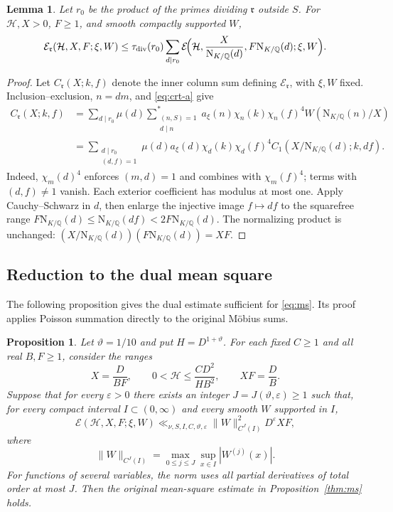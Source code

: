 \documentclass[11pt,a4paper]{article}
\numberwithin{equation}{section}
\numberwithin{figure}{section}
\newtheorem{proposition}[theorem]{Proposition}
\newtheorem{lemma}[theorem]{Lemma}
\theoremstyle{definition}
\theoremstyle{remark}
\newcommand{\Q}{\mathbb Q}
\newcommand{\NK}{\mathrm N_{K/\Q}}
\newcommand{\E}{\mathcal E}
\begin{document}
\begin{lemma}\label{lem:remove-exclusions}
Let $r_0$ be the product of the primes dividing $\mathfrak r$ outside
$S$. For $\mathcal H,X>0$, $F\ge1$, and smooth compactly supported $W$,
\begin{equation}\label{eq:remove-exclusions}
 \E_{\mathfrak r}(\mathcal H,X,F;\xi,W)
 \le\tau_{\mathrm{div}}(r_0)
 \sum_{d\mid r_0}\E\!\Bigl(\mathcal H,\frac X{\NK(d)},F\NK(d);\xi,W\Bigr).
\end{equation}
\end{lemma}
\begin{proof}
Let $C_{\mathfrak r}(X;k,f)$ denote the inner column sum defining
$\E_{\mathfrak r}$, with $\xi,W$ fixed. Inclusion--exclusion,
$n=dm$, and \eqref{eq:crt-a} give
\[
 \begin{aligned}
 C_{\mathfrak r}(X;k,f)
 &=\sum_{d\mid r_0}\mu(d)
   \sum_{\substack{(n,S)=1\\d\mid n}}^*
   a_\xi(n)\chi_n(k)\chi_n(f)^4W(\NK(n)/X)\\
 &=\sum_{\substack{d\mid r_0\\(d,f)=1}}
   \mu(d)a_\xi(d)\chi_d(k)\chi_d(f)^4
   C_1(X/\NK(d);k,df).
 \end{aligned}
\]
Indeed, $\chi_m(d)^4$ enforces $(m,d)=1$ and combines with
$\chi_m(f)^4$; terms with $(d,f)\ne1$ vanish. Each exterior
coefficient has modulus at most one. Apply Cauchy--Schwarz in $d$,
then enlarge the injective image $f\mapsto df$ to the squarefree
range $F\NK(d)\le\NK(df)<2F\NK(d)$. The normalizing product is
unchanged: $(X/\NK(d))(F\NK(d))=XF$.
\end{proof}


\subsection{Reduction to the dual mean square}
The following proposition gives the dual estimate sufficient for
\eqref{eq:ms}. Its proof applies Poisson summation directly to the
original M\"obius sums.

\begin{proposition}\label{prop:poisson-reduction}
Let $\vartheta=1/10$ and put $H=D^{1+\vartheta}$.
For each fixed $C\ge1$ and all real $B,F\ge1$, consider the ranges
\begin{equation}\label{eq:initial-scales}
 X=\frac D{BF},\qquad 0<\mathcal{H}\le\frac{CD^2}{HB^2},\qquad
 XF=\frac DB.
\end{equation}
Suppose that for every $\varepsilon>0$ there exists an integer
$J=J(\vartheta,\varepsilon)\ge1$ such that, for every compact interval
$I\subset(0,\infty)$ and every smooth $W$ supported in $I$,
\begin{equation}\label{eq:auxiliary-target}
 \E(\mathcal H,X,F;\xi,W)
 \ll_{\nu,S,I,C,\vartheta,\varepsilon}\|W\|_{C^J(I)}^2D^\varepsilon XF,
\end{equation}
where
\[
 \|W\|_{C^J(I)}=\max_{0\le j\le J}\sup_{x\in I}|W^{(j)}(x)|.
\]
For functions of several variables, the norm uses all partial derivatives
of total order at most $J$.
Then the original mean-square
estimate in Proposition~\ref{thm:ms} holds.
\end{proposition}
\end{document}
